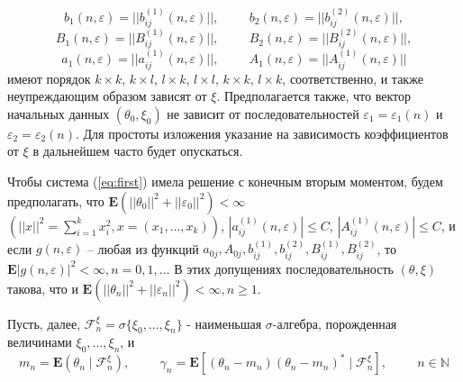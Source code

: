 $$
b_1(n, \varepsilon) = || b_{ij}^{(1)} (n, \varepsilon) ||, \hspace{1cm} b_2(n, \varepsilon) = || b_{ij}^{(2)} (n, \varepsilon) ||,
$$
$$
B_1(n, \varepsilon) = || B_{ij}^{(1)} (n, \varepsilon) ||, \hspace{1cm} B_2(n, \varepsilon) = || B_{ij}^{(2)} (n, \varepsilon) ||,
$$
$$
a_1(n, \varepsilon) = || a_{ij}^{(1)} (n, \varepsilon) ||, \hspace{1cm} A_1(n, \varepsilon) = || A_{ij}^{(1)} (n, \varepsilon) ||
$$
имеют порядок $k \times k$, $k \times l$, $l \times k$, $l \times l$, $k \times k$, $l \times k$, соответственно, и также неупреждающим образом зависят от $\xi$. Предполагается также, что вектор начальных данных $(\theta_0, \xi_0)$ не зависит от последовательностей $\varepsilon_1 = \varepsilon_1(n)$ и $\varepsilon_2 = \varepsilon_2(n)$.
Для простоты изложения указание на зависимость коэффициентов от $\xi$ в дальнейшем часто будет опускаться.

Чтобы система (\ref{eq:first}) имела решение с конечным вторым моментом, будем предполагать, что $\mathbf{E}(||\theta_0||^2 + ||\varepsilon_0||^2) < \infty$ $\left(||x||^2 = \sum\limits_{i=1}^{k} x_i^2, x = (x_1, ..., x_k) \right)$, $|a_{ij}^{(1)} (n, \varepsilon)| \leqslant C$, $|A_{ij}^{(1)} (n, \varepsilon)| \leqslant C$, и если $g(n, \varepsilon)$ – любая из функций $a_{0j}, A_{0j}, b_{ij}^{(1)}, b_{ij}^{(2)}, B_{ij}^{(1)}, B_{ij}^{(2)} $, то $\mathbf{E}|g(n, \varepsilon)|^2 < \infty, n = 0, 1, ...$ В этих допущениях последовательность $(\theta, \xi)$ такова, что и $\mathbf{E}(||\theta_n||^2 + ||\varepsilon_n||^2) < \infty, n \geqslant 1$.

Пусть, далее, $\mathscr{F}^{\xi}_n = \sigma\{\xi_0, ..., \xi_n\}$ - наименьшая $\sigma$-алгебра, порожденная величинами $\xi_0, ..., \xi_n$, и
$$m_n = \mathbf{E}(\theta_n\mid\mathscr{F}^{\xi}_n), \hspace{1cm} \gamma_n = \mathbf{E} \left[(\theta_n - m_n)(\theta_n - m_n)^*\mid \mathscr{F}^{\xi}_n \right], \hspace{1cm} n \in \mathbb{N}$$

